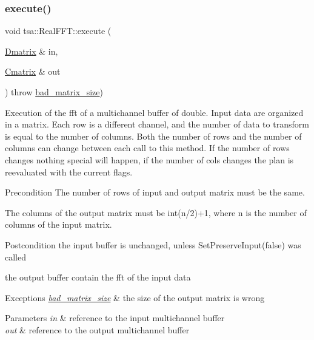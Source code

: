 \subsubsection{\texorpdfstring{execute()}{execute()}\hspace{0.1cm}{\footnotesize\ttfamily [1/3]}}
{\footnotesize\ttfamily void tsa\+::\+Real\+F\+F\+T\+::execute (\begin{DoxyParamCaption}\item[{\hyperlink{namespacetsa_ad260cd21c1891c4ed391fe788569aba4}{Dmatrix} \&}]{in,  }\item[{\hyperlink{namespacetsa_a86348fef1603a135fe5fba9e5f5486ee}{Cmatrix} \&}]{out }\end{DoxyParamCaption}) throw  \hyperlink{classtsa_1_1bad__matrix__size}{bad\+\_\+matrix\+\_\+size}) }

Execution of the fft of a multichannel buffer of double. Input data are organized in a matrix. Each row is a different channel, and the number of data to transform is equal to the number of columns. Both the number of rows and the number of columns can change between each call to this method. If the number of rows changes nothing special will happen, if the number of cols changes the plan is reevaluated with the current flags.

\begin{DoxyPrecond}{Precondition}
The number of rows of input and output matrix must be the same. 

The columns of the output matrix must be int(n/2)+1, where n is the number of columns of the input matrix.
\end{DoxyPrecond}
\begin{DoxyPostcond}{Postcondition}
the input buffer is unchanged, unless Set\+Preserve\+Input(false) was called 

the output buffer contain the fft of the input data
\end{DoxyPostcond}

\begin{DoxyExceptions}{Exceptions}
{\em \hyperlink{classtsa_1_1bad__matrix__size}{bad\+\_\+matrix\+\_\+size}} & the size of the output matrix is wrong \\
\hline
\end{DoxyExceptions}

\begin{DoxyParams}{Parameters}
{\em in} & reference to the input multichannel buffer \\
\hline
{\em out} & reference to the output multichannel buffer \\
\hline
\end{DoxyParams}


